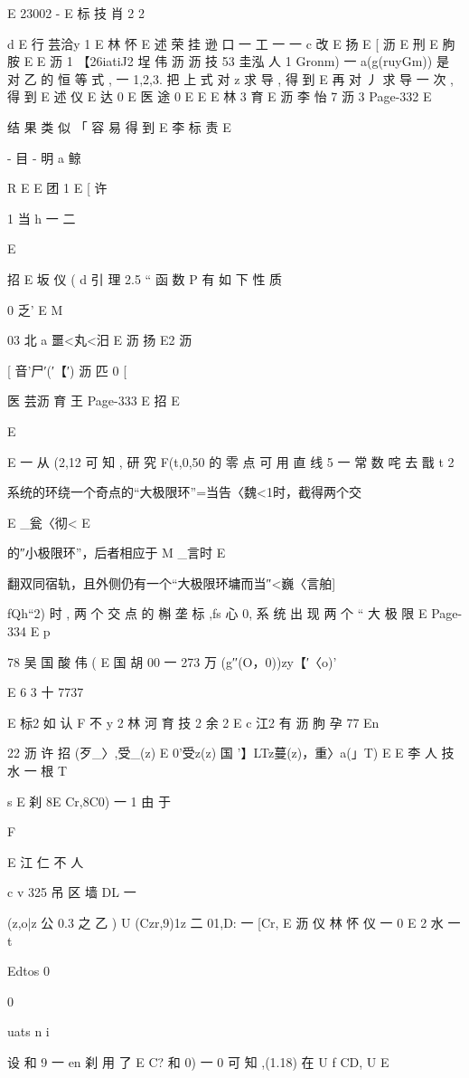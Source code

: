 {{{{{{{{{{{{{{{{{{{E 23002 - E 标 技 肖 2
2

d
E 行 芸洽y 1
E 林
怀
E 述 荣 挂 逊 口 一 工 一 一
c
改
E 扬 E
[ 沥 E 刑
E 朐 胺
E
E 沥 1
【26iatiJ2 埕 伟 沥 沥 技 53 圭泓 人 1
Gronm) 一 a(g(ruyGm))
是 对 乙 的 恒 等 式 , 一 1,2,3. 把 上 式 对 z 求 导 , 得 到
E
再 对 丿 求 导 一 次 , 得 到
E 述 仪
E 达
0
E 医 途 0 E
E E 林 3 育
E 沥 李 怡 7 沥 3
Page-332
E

结 果 类 似 「 容 易 得 到
E 李 标 责 E

- 目 - 明 a 鲸

R
E
E 团
1 E [ 许

1 当 h 一 二

E

招
E 坂 仪 ( d
引 理 2.5 “ 函 数 P 有 如 下 性 质

0 乏' E
M

03 北 a 噩<丸<汨 E 沥 扬
E2 沥

[ 音'尸′(′【′) 沥 匹 0 [

医 芸沥 育 王
Page-333
E 招 E

E

E 一
从 (2,12 可 知 , 研 究 F(t,0,50 的 零 点 可 用 直 线 5 一 常 数 咤 去 戬
t 2

系统的环绕一个奇点的“大极限环”=当告〈魏<1时，截得两个交

E _瓮〈彻< E

的″小极限环”，后者相应于 M _言时 E

翻双同宿轨，且外侧仍有一个“大极限环墉而当″<巍〈言舶]

fQh“2) 时 , 两 个 交 点 的 槲 垄 标 ,fs 心 0, 系 统 出 现 两 个 “ 大 极 限
E
Page-334
E p

78 吴 国 酸 伟 ( E 国 胡
00 一 273 万 (g′′(O，0))zy【′〈o)'

E 6 3 十 7737

E 标2 如 认 F
不 y 2 林 河 育 技 2 余 2
E c 江2 有 沥 朐 孕 77
En

22 沥 许 招 (歹_〉,受_(z) E 0'受z(z) 国 '】LTz蔓(z)，重〉a(」T) E
E 李 人 技 水 一 根
T

s
E 刹 8E Cr,8C0) 一 1 由 于

F

E 江 仁 不 人

c
v 325
吊 区 墙 DL 一 {(z,o|z 公 0.3 之 乙 ) U (Czr,9)1z 二 01,D: 一 [Cr,
E 沥 仪 林 怀 仪 一
0
E 2
水 一
t

Edtos 0

0

uats n i

设 和 9 一 en 刹 用 了 E C? 和 0) 一 0 可 知 ,(1.18) 在 U f CD, U
E

}}}}}}}}}}}}}}}}}}}}
